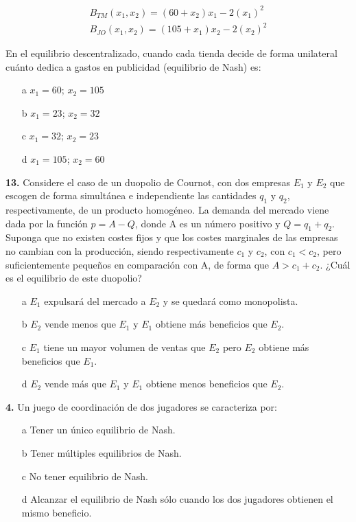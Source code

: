 \documentclass{nuevotema}
\begin{document}
\begin{align*}
	B_{TM} (x_1, x_2) = (60+x_2)x_1 - 2(x_1)^2 \\
	B_{JO}(x_1, x_2) = (105 + x_1) x_2 - 2 (x_2)^2
\end{align*}

En el equilibrio descentralizado, cuando cada tienda decide de forma unilateral cuánto dedica a gastos en publicidad (equilibrio de Nash) es:

\begin{itemize}
	\item[a] $x_1 = 60$; $x_2 =105$
	\item[b] $x_1 = 23$; $x_2 = 32$
	\item[c] $x_1 = 32$; $x_2 =23$
	\item[d] $x_1 = 105$; $x_2 = 60$
\end{itemize}

\textbf{13.} Considere el caso de un duopolio de Cournot, con dos empresas $E_1$ y $E_2$ que escogen de forma simultánea e independiente las cantidades $q_1$ y $q_2$, respectivamente, de un producto homogéneo. La demanda del mercado viene dada por la función $p=A-Q$, donde A es un número positivo y $Q = q_1 + q_2$. Suponga que no existen costes fijos y que los costes marginales de las empresas no cambian con la producción, siendo respectivamente $c_1$ y $c_2$, con $c_1 < c_2$, pero suficientemente pequeños en comparación con A, de forma que $A > c_1 + c_2$. ¿Cuál es el equilibrio de este duopolio?

\begin{itemize}
	\item[a] $E_1$ expulsará del mercado a $E_2$ y se quedará como monopolista.
	\item[b] $E_2$ vende menos que $E_1$ y $E_1$ obtiene más beneficios que $E_2$.
	\item[c] $E_1$ tiene un mayor volumen de ventas que $E_2$ pero $E_2$ obtiene más beneficios que $E_1$. 
	\item[d] $E_2$ vende más que $E_1$ y $E_1$ obtiene menos beneficios que $E_2$.
\end{itemize}



\textbf{4.} Un juego de coordinación de dos jugadores se caracteriza por:
\begin{enumerate}
	\item[a] Tener un único equilibrio de Nash.
	\item[b] Tener múltiples equilibrios de Nash.
	\item[c] No tener equilibrio de Nash.
	\item[d] Alcanzar el equilibrio de Nash sólo cuando los dos jugadores obtienen el mismo beneficio.
\end{enumerate}
\end{document}
